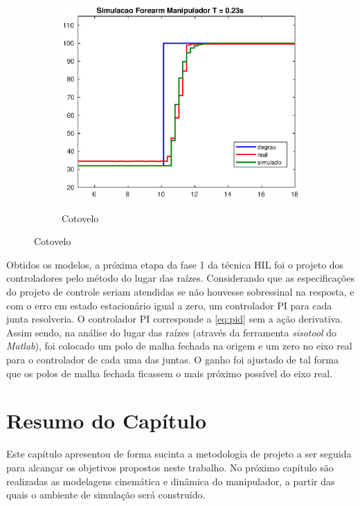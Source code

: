 \begin{figure}[h!]
\begin{subfigure}{.5\textwidth}
    \label{fig:shoulder_ma_simul}
  \end{subfigure}%
  \\[5ex]
  \begin{subfigure}{\textwidth}
    \centering
    \caption{Cotovelo}
    \includegraphics[width = 0.55\columnwidth]{Imagens/forearm_ma_simul}
    \label{fig:forearm_ma_simul}
  \end{subfigure}%
  
  \label{fig:ensaioMalhaAberta} 

\end{figure}

Obtidos os modelos, a próxima etapa da fase 1 da técnica HIL foi o projeto dos 
controladores pelo método do lugar das raízes. Considerando que as especificações do projeto
de controle seriam atendidas se não houvesse sobressinal na resposta, e com o erro em estado
estacionário igual a zero, um controlador PI para cada junta resolveria. O controlador PI 
corresponde a \autoref{eq:pid} sem a ação derivativa. Assim sendo, na análise do lugar das
raízes (através da ferramenta \textit{sisotool} do \textit{Matlab}), foi colocado um polo de malha
fechada na origem e um zero no eixo real para o controlador de cada uma das juntas. O ganho foi 
ajustado de tal forma que os polos de malha fechada ficassem o mais próximo possível do eixo real.

\section{Resumo do Capítulo}


Este capítulo apresentou de forma sucinta a metodologia de projeto a ser seguida para 
alcançar os objetivos propostos neste trabalho. No próximo capítulo são realizadas 
as modelagens cinemática e dinâmica do manipulador, a partir das quais o ambiente de 
simulação será construído.


\clearpage